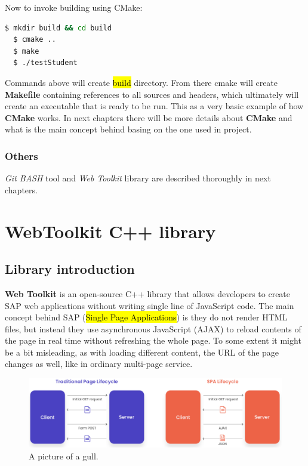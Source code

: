 \documentclass[a4paper,12pt]{article}
\newcommand\tab[1][1cm]{\hspace*{#1}}
\begin{document}
{{\noindent Now to invoke building using CMake:
\begin{lstlisting}[language=bash]
  $ mkdir build && cd build
  $ cmake ..
  $ make
  $ ./testStudent
\end{lstlisting}
  
\bigskip Commands above will create \hl{build} directory. From there cmake will create \textbf{Makefile} containing references to all sources and headers, which ultimately will create an executable that is ready to be run. This as a very basic example of how \textbf{CMake} works. In next chapters there will be more details about \textbf{CMake} and what is the main concept behind basing on the one used in project. 

}

\subsubsection*{Others}
\textit{Git BASH} tool and \textit{Web Toolkit} library are described thoroughly in next chapters.
\newpage

\section{WebToolkit C++ library}
\subsection{Library introduction}
{\tab \textbf{Web Toolkit} is an open-source C++ library that allows developers to create SAP web applications without writing single line of JavaScript code. The main concept behind \cite{singlepageapplications}SAP (\hl{Single Page Applications}) is they do not render HTML files, but instead they use asynchronous JavaScript (AJAX) to reload contents of the page in real time without refreshing the whole page. To some extent it might be a bit misleading, as with loading different content, the URL of the page changes as well, like in ordinary multi-page service.\\

\begin{figure}[h]
  \centering
    \includegraphics[width=1.0\textwidth]{spa}
    \caption{A picture of a gull.}
\end{figure}


}}
\end{document}
